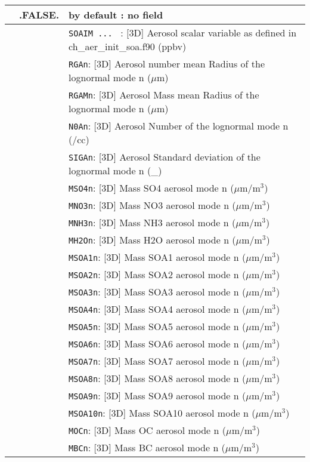 \begin{center}
\begin{makeimage}
\begin{tabular}{|>{\centering}p{3cm}|>{\centering}p{2.5cm}|p{11cm}|}
\hline
\multirow{26}{*}{LCHEMDIAG}\index{LCHEMDIAG!\innam{NAM\_DIAG}}&\textbf{.FALSE.}&  by default : no field\\\cline{2-3}
&\multirow{25}{*}{.TRUE.}  &{\tt SOAIM ... } : [3D] Aerosol scalar variable as defined in ch\_aer\_init\_soa.f90 (ppbv)\\ \cline{3-3}
& &{\tt RGAn}: [3D] Aerosol number mean Radius of the lognormal mode n ($\mu$m)\\\cline{3-3}
&  &{\tt RGAMn}: [3D] Aerosol Mass mean Radius of the lognormal mode n ($\mu$m)\\\cline{3-3}
&  &{\tt N0An}: [3D] Aerosol Number of the lognormal mode n (/cc)
\\\cline{3-3}
& &{\tt SIGAn}: [3D] Aerosol Standard deviation of the lognormal mode n (\_)\\\cline{3-3}
& &{\tt MSO4n}: [3D] Mass SO4 aerosol mode n ($\mu$m/m$^3$)\\\cline{3-3}
& &{\tt MNO3n}: [3D] Mass NO3 aerosol mode n ($\mu$m/m$^3$)\\\cline{3-3}
& &{\tt MNH3n}: [3D] Mass NH3 aerosol mode n ($\mu$m/m$^3$)\\\cline{3-3}
& &{\tt MH2On}: [3D] Mass H2O aerosol mode n ($\mu$m/m$^3$)\\\cline{3-3}
& &{\tt MSOA1n}: [3D] Mass SOA1 aerosol mode n ($\mu$m/m$^3$)\\\cline{3-3}
& &{\tt MSOA2n}: [3D] Mass SOA2 aerosol mode n ($\mu$m/m$^3$)\\\cline{3-3}
& &{\tt MSOA3n}: [3D] Mass SOA3 aerosol mode n ($\mu$m/m$^3$)\\\cline{3-3}
& &{\tt MSOA4n}: [3D] Mass SOA4 aerosol mode n ($\mu$m/m$^3$)\\\cline{3-3}
& &{\tt MSOA5n}: [3D] Mass SOA5 aerosol mode n ($\mu$m/m$^3$)\\\cline{3-3}
& &{\tt MSOA6n}: [3D] Mass SOA6 aerosol mode n ($\mu$m/m$^3$)\\\cline{3-3}
& &{\tt MSOA7n}: [3D] Mass SOA7 aerosol mode n ($\mu$m/m$^3$)\\\cline{3-3}
& &{\tt MSOA8n}: [3D] Mass SOA8 aerosol mode n ($\mu$m/m$^3$)\\\cline{3-3}
& &{\tt MSOA9n}: [3D] Mass SOA9 aerosol mode n ($\mu$m/m$^3$)\\\cline{3-3}
& &{\tt MSOA10n}: [3D] Mass SOA10 aerosol mode n ($\mu$m/m$^3$)\\\cline{3-3}
& &{\tt MOCn}: [3D] Mass OC aerosol mode n ($\mu$m/m$^3$)\\\cline{3-3}
& &{\tt MBCn}: [3D] Mass BC aerosol mode n ($\mu$m/m$^3$)\\\hline
\end{tabular} 
\end{makeimage}
\end{center}

